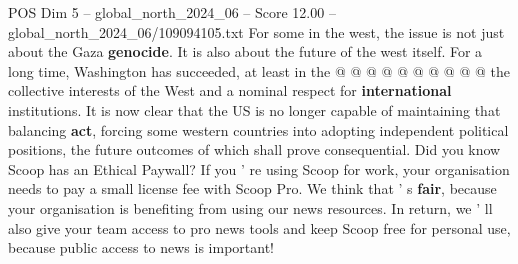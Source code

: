 \begin{textsample}{POS Dim 5 – global\_north\_2024\_06 – Score 12.00 – global\_north\_2024\_06/109094105.txt}
For some in the west, the issue is not just about the Gaza \textbf{genocide}.
It is also about the future of the west itself.
For a long time, Washington has succeeded, at least in the @ @ @ @ @ @ @ @ @ @ the collective interests of the West and a nominal respect for \textbf{international} institutions.
It is now clear that the US is no longer capable of maintaining that balancing \textbf{act}, forcing some western countries into adopting independent political positions, the future outcomes of which shall prove consequential.
Did you know Scoop has an Ethical Paywall?
If you ' re using Scoop for work, your organisation needs to pay a small license fee with Scoop Pro.
We think that ' s \textbf{fair}, because your organisation is benefiting from using our news resources.
In return, we ' ll also give your team access to pro news tools and keep Scoop free for personal use, because public access to news is important!

\end{textsample}
